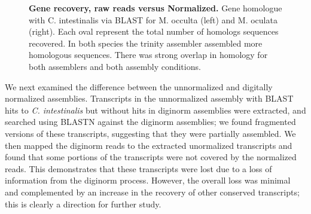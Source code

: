 \documentclass[fleqn,10pt]{wlpeerj}
\begin{document}
 \setcounter{subfigure}{0}
\begin{figure}[tbp]
	\begin{center}
	\end{center}
	\caption{\textbf{Gene recovery, raw reads versus Normalized.} Gene homologue with C. intestinalis via BLAST for M. occulta (left) and M. oculata (right). Each oval represent the total number of homologs sequences recovered. In both species the trinity assembler assembled more homologous sequences. There was strong overlap in homology for both assemblers and both assembly conditions.}
	\label{fig:overlap}
\end{figure}
     
We next examined the difference between the unnormalized and digitally normalized assemblies. Transcripts in the unnormalized assembly with BLAST hits to \textit{C. intestinalis} but without hits in diginorm assemblies were extracted, and searched using BLASTN against the diginorm assemblies; we found fragmented versions of these transcripts, suggesting that they were partially assembled.  We then mapped the diginorm reads to the extracted unormalized transcripts and found that some portions of the transcripts were not covered by the normalized reads. This demonstrates that these transcripts were lost due to a loss of information from the diginorm process.  However, the overall loss was minimal and complemented by an increase in the recovery of other conserved transcripts; this is clearly a direction for further study.
\end{document}
